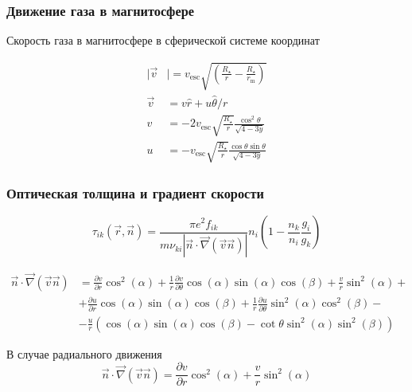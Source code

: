\documentclass{beamer}
\begin{document}
\begin{frame}[noframenumbering]
\frametitle{Движение газа в магнитосфере}
Скорость газа в магнитосфере в сферической системе координат

\begin{align} \label{eq:velvec}
|\vec{v}&|  = v_\text{esc}\sqrt{\left(\frac{R_\star}{r} - \frac{R_\star}{r_\text{m}}\right)} \\
 \vec{v} & = v \hat{r} + u \hat{\theta}/r\\
 v & = -2v_\text{esc}\sqrt{\frac{R_\star}{r}}\frac{\cos^2\theta}{\sqrt{4-3y}}  \\
 u & = -v_\text{esc}\sqrt{\frac{R_\star}{r}}\frac{\cos\theta\sin\theta}{\sqrt{4-3y}} 
\end{align}

\end{frame}

\begin{frame}[noframenumbering]
\frametitle{Оптическая толщина и градиент скорости}
\begin{equation}
\tau_{ik}(\vec{r},\vec{n}) = \frac{\pi e^2 f_{ik}}{m \nu_{ki} |\vec{n}\cdot \vec{\nabla} (\vec{v}\vec{n})|} n_i \left( 1 - \frac{n_k}{n_i}\frac{g_i}{g_k} \right)
\end{equation} 

\begin{align} \label{eq:vecgrad}
\vec{n}\cdot\vec{\nabla}(\vec{v}\vec{n}) & = \frac{\partial v}{\partial r}\cos^2(\alpha) + \frac{1}{r}\frac{\partial v}{\partial \theta}\cos(\alpha)\sin(\alpha)\cos(\beta) + \frac{v}{r}\sin^2(\alpha) + \nonumber \\
& + \frac{\partial u}{\partial r} \cos(\alpha)\sin(\alpha)\cos(\beta) + \frac{1}{r}\frac{\partial u}{\partial \theta} \sin^2(\alpha)\cos^2(\beta) - \nonumber \\
& - \frac{u}{r}\left(\cos(\alpha)\sin(\alpha)\cos(\beta) - \cot\theta\sin^2(\alpha)\sin^2(\beta)\right)
\end{align}

В случае радиального движения
\[
\vec{n}\cdot \vec{\nabla}(\vec{v}\vec{n}) = \frac{\partial v}{\partial r}\cos^2(\alpha) + \frac{v}{r}\sin^2(\alpha) 
\]

\end{frame}
\end{document}
